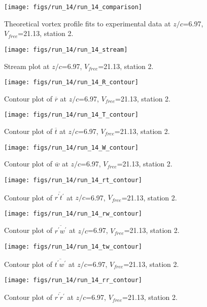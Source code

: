 \begin{figure}[H]
\centering
\texttt{[image: figs/run\_14/run\_14\_comparison]}
\caption{Theoretical vortex profile fits to experimental data at $z/c$=6.97, $V_{free}$=21.13, station 2.}
\end{figure}


\begin{figure}[H]
\centering
\texttt{[image: figs/run\_14/run\_14\_stream]}
\caption{Stream plot at $z/c$=6.97, $V_{free}$=21.13, station 2.}
\end{figure}


\begin{figure}[H]
\centering
\texttt{[image: figs/run\_14/run\_14\_R\_contour]}
\caption{Contour plot of $\overline{r}$ at $z/c$=6.97, $V_{free}$=21.13, station 2.}
\end{figure}


\begin{figure}[H]
\centering
\texttt{[image: figs/run\_14/run\_14\_T\_contour]}
\caption{Contour plot of $\overline{t}$ at $z/c$=6.97, $V_{free}$=21.13, station 2.}
\end{figure}


\begin{figure}[H]
\centering
\texttt{[image: figs/run\_14/run\_14\_W\_contour]}
\caption{Contour plot of $\overline{w}$ at $z/c$=6.97, $V_{free}$=21.13, station 2.}
\end{figure}


\begin{figure}[H]
\centering
\texttt{[image: figs/run\_14/run\_14\_rt\_contour]}
\caption{Contour plot of $\overline{r^\prime t^\prime}$ at $z/c$=6.97, $V_{free}$=21.13, station 2.}
\end{figure}


\begin{figure}[H]
\centering
\texttt{[image: figs/run\_14/run\_14\_rw\_contour]}
\caption{Contour plot of $\overline{r^\prime w^\prime}$ at $z/c$=6.97, $V_{free}$=21.13, station 2.}
\end{figure}


\begin{figure}[H]
\centering
\texttt{[image: figs/run\_14/run\_14\_tw\_contour]}
\caption{Contour plot of $\overline{t^\prime w^\prime}$ at $z/c$=6.97, $V_{free}$=21.13, station 2.}
\end{figure}


\begin{figure}[H]
\centering
\texttt{[image: figs/run\_14/run\_14\_rr\_contour]}
\caption{Contour plot of $\overline{r^\prime r^\prime}$ at $z/c$=6.97, $V_{free}$=21.13, station 2.}
\end{figure}


